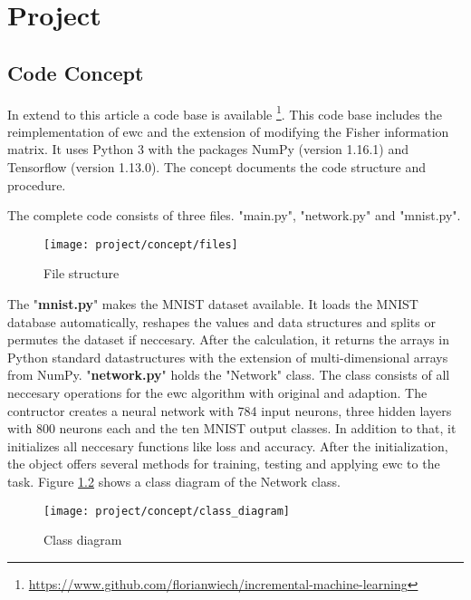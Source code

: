 \chapter{Project}

\section{Code Concept}

In extend to this article a code base is available \footnote{\url{https://www.github.com/florianwiech/incremental-machine-learning}}.
This code base includes the reimplementation of \acrshort{ewc} and the extension of modifying the Fisher information matrix.
It uses Python 3 with the packages NumPy (version 1.16.1) and Tensorflow (version 1.13.0).
The concept documents the code structure and procedure.

The complete code consists of three files.
"main.py", "network.py" and "mnist.py".

\begin{figure}[H]
    \centering
    \texttt{[image: project/concept/files]}
    \caption{File structure}
    \label{fig:concept_file_structure}
\end{figure}

The "\textbf{mnist.py}" makes the MNIST dataset available.
It loads the MNIST database automatically, reshapes the values and data structures and splits or permutes the dataset if neccesary.
After the calculation, it returns the arrays in Python standard datastructures with the extension of multi-dimensional arrays from NumPy.
\newline
"\textbf{network.py}" holds the "Network" class.
The class consists of all neccesary operations for the \acrshort{ewc} algorithm with original and adaption.
The contructor creates a neural network with 784 input neurons, three hidden layers with 800 neurons each and the ten MNIST output classes.
In addition to that, it initializes all neccesary functions like loss and accuracy.
After the initialization, the object offers several methods for training, testing and applying \acrshort{ewc} to the task.
Figure \ref{fig:concept_class_diagram} shows a class diagram of the Network class.

\begin{figure}[H]
    \centering
    \texttt{[image: project/concept/class\_diagram]}
    \caption{Class diagram}
    \label{fig:concept_class_diagram}
\end{figure}

